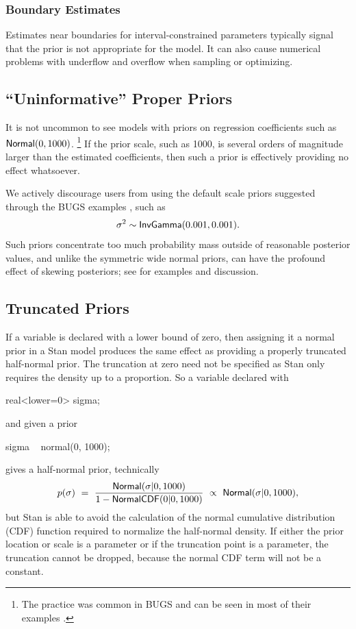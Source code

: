 \subsubsection{Boundary Estimates}

Estimates near boundaries for interval-constrained parameters
typically signal that the prior is not appropriate for the model.  It
can also cause numerical problems with underflow and overflow when
sampling or optimizing.

\subsection{``Uninformative'' Proper Priors}

It is not uncommon to see models with priors on regression
coefficients such as $\mbox{\sf Normal}(0,1000)$.%
%
\footnote{The practice was common in BUGS and can be seen in most of
  their examples \cite{LunnEtAl:2012}.}
%
If the prior scale, such as 1000, is several orders of magnitude
larger than the estimated coefficients, then such a prior is
effectively providing no effect whatsoever.

We actively discourage users from using the default scale priors
suggested through the BUGS examples \citep{LunnEtAl:2012}, such as
\[
\sigma^2 \sim \mbox{\sf InvGamma}(0.001, 0.001).
\]
%
Such priors concentrate too much probability mass outside of
reasonable posterior values, and unlike the symmetric wide normal
priors, can have the profound effect of skewing posteriors; see
\citep{Gelman:2006} for examples and discussion.

\subsection{Truncated Priors}

If a variable is declared with a lower bound of zero, then assigning
it a normal prior in a Stan model produces the same effect as
providing a properly truncated half-normal prior.  The truncation at
zero need not be specified as Stan only requires the density up to a
proportion.  So a variable declared with
%
\begin{stancode}
real<lower=0> sigma;
\end{stancode}
%
and given a prior
\begin{stancode}
sigma ~ normal(0, 1000);
\end{stancode}
%
gives  a half-normal prior, technically
%
\[
p(\sigma)
\ = \
\frac{\mbox{\sf Normal}(\sigma | 0, 1000)}
     {1 - \mbox{\sf NormalCDF}(0 | 0, 1000)}
\ \propto \
\mbox{\sf Normal}(\sigma | 0, 1000),
\]
%
but Stan is able to avoid the calculation of the normal cumulative
distribution (CDF) function required to normalize the half-normal density.
If either the prior location or scale is a parameter or if the
truncation point is a parameter, the truncation cannot be dropped,
because the normal CDF term will not be a constant.



